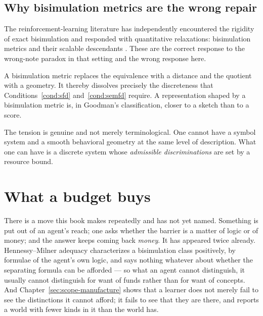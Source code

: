 \subsection{Why bisimulation metrics are the wrong repair}
\label{sec:metrics}

The reinforcement-learning literature has independently encountered
the rigidity of exact bisimulation and responded with quantitative
relaxations: bisimulation metrics \cite{ferns2004} and their
scalable descendants \cite{gelada2019,zhang2021,castro2021}.
These are the correct response to the wrong-note paradox in that
setting and the wrong response here.

\begin{observation}
\label{obs:metric}
A bisimulation metric replaces the equivalence with a distance and
the quotient with a geometry.
It thereby dissolves precisely the discreteness that
Conditions~\ref{cond:sfd} and~\ref{cond:semfd} require.
A representation shaped by a bisimulation metric is, in Goodman's
classification, closer to a sketch than to a score.
\end{observation}

\noindent
The tension is genuine and not merely terminological.
One cannot have a symbol system and a smooth behavioral geometry
at the same level of description.
What one can have is a discrete system whose \emph{admissible
discriminations} are set by a resource bound.

\section{What a budget buys}
\label{sec:budget}

There is a move this book makes repeatedly and has not yet named.
Something is put out of an agent's reach; one asks whether the
barrier is a matter of logic or of money; and the answer keeps
coming back \emph{money}.
It has appeared twice already.
Hennessy--Milner adequacy characterizes a bisimulation class
positively, by formulae of the agent's own logic, and says nothing
whatever about whether the separating formula can be afforded ---
so what an agent cannot distinguish, it usually cannot distinguish
for want of funds rather than for want of concepts.
And Chapter~\ref{sec:scope-manufacture} shows that a learner does
not merely fail to see the distinctions it cannot afford; it fails
to see that they are there, and reports a world with fewer kinds in
it than the world has.

